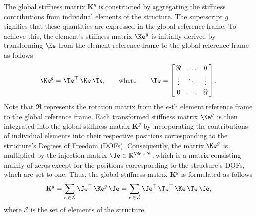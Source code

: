 The global stiffness matrix $\mathbf{K}^{g}$ is constructed by aggregating the stiffness contributions from individual elements of the structure. The superscript $g$ signifies that these quantities are expressed in the global reference frame. To achieve this, the element's stiffness matrix $\Ke^{g}$ is initially derived by transforming $\Ke$ from the element reference frame to the global reference frame as follows
%
\begin{equation}
  \label{app4:eq:element_stiffness_matrix}
  \Ke^{g} = \Te^\top \, \Ke \, \Te \text{,} \qquad \text{where} \qquad \Te = \left[\,\begin{matrix}
    \Re    & \ldots & 0 \\[0.25em]
    \vdots & \ddots & \vdots \\[0.25em]
    0      & \ldots & \Re
  \end{matrix}\,\right] \text{.}
\end{equation}
%
Note that $\Re$ represents the rotation matrix from the $e$-th element reference frame to the global reference frame. Each transformed stiffness matrix $\Ke^{g}$ is then integrated into the global stiffness matrix $\mathbf{K}^{g}$ by incorporating the contributions of individual elements into their respective positions corresponding to the structure's Degrees of Freedom (\acp{DOF}). Consequently, the matrix $\Ke^{g}$ is multiplied by the injection matrix $\Je \in \mathbb{R}^{\Ne \times N}$, which is a matrix consisting mainly of zeros except for the positions corresponding to the structure's \acp{DOF}, which are set to one. Thus, the global stiffness matrix $\mathbf{K}^{g}$ is formulated as follows
%
\begin{equation}
  \mathbf{K}^{g} = \sum_{e \, \in \, \mathcal{E}} \Je^\top \, \Ke^{g} \, \Je
   = \sum_{e \, \in \, \mathcal{E}} \Je^\top \, \Te^\top\,\Ke \, \Te \, \Je \text{,}
\end{equation}
%
where $\mathcal{E}$ is the set of elements of the structure.

